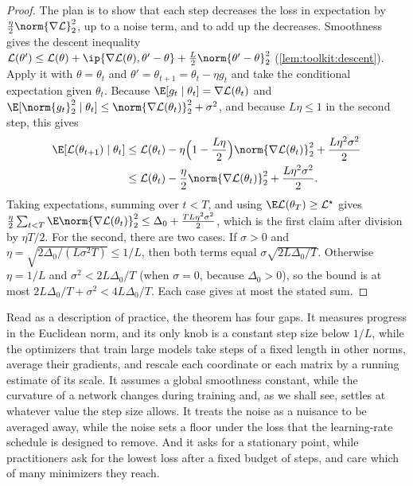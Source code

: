 \begin{refsection}
\begin{proof}
The plan is to show that each step decreases the loss in expectation by $\frac\eta2\norm{\nabla\Loss}_2^2$, up to a noise term, and to add up the decreases. Smoothness gives the descent inequality $\Loss(\theta')\le\Loss(\theta)+\ip{\nabla\Loss(\theta),\theta'-\theta}+\frac L2\norm{\theta'-\theta}_2^2$ (\cref{lem:toolkit:descent}). Apply it with $\theta=\theta_t$ and $\theta'=\theta_{t+1}=\theta_t-\eta g_t$ and take the conditional expectation given $\theta_t$. Because $\E[g_t\mid\theta_t]=\nabla\Loss(\theta_t)$ and $\E[\norm{g_t}_2^2\mid\theta_t]\le\norm{\nabla\Loss(\theta_t)}_2^2+\sigma^2$, and because $L\eta\le1$ in the second step, this gives
\[
\begin{aligned}
  \E[\Loss(\theta_{t+1})\mid\theta_t]&\le\Loss(\theta_t)-\eta\Bigl(1-\frac{L\eta}2\Bigr)\norm{\nabla\Loss(\theta_t)}_2^2+\frac{L\eta^2\sigma^2}2\\
  &\le\Loss(\theta_t)-\frac\eta2\norm{\nabla\Loss(\theta_t)}_2^2+\frac{L\eta^2\sigma^2}2.
\end{aligned}
\]
Taking expectations, summing over $t<T$, and using $\E\Loss(\theta_T)\ge\Loss^\star$ gives $\frac\eta2\sum_{t<T}\E\norm{\nabla\Loss(\theta_t)}_2^2\le\Delta_0+\frac{TL\eta^2\sigma^2}2$, which is the first claim after division by $\eta T/2$. For the second, there are two cases. If $\sigma>0$ and $\eta=\sqrt{2\Delta_0/(L\sigma^2T)}\le1/L$, then both terms equal $\sigma\sqrt{2L\Delta_0/T}$. Otherwise $\eta=1/L$ and $\sigma^2<2L\Delta_0/T$ (when $\sigma=0$, because $\Delta_0>0$), so the bound is at most $2L\Delta_0/T+\sigma^2<4L\Delta_0/T$. Each case gives at most the stated sum.
\end{proof}

Read as a description of practice, the theorem has four gaps. It measures progress in the Euclidean norm, and its only knob is a constant step size below $1/L$, while the optimizers that train large models take steps of a fixed length in other norms, average their gradients, and rescale each coordinate or each matrix by a running estimate of its scale. It assumes a global smoothness constant, while the curvature of a network changes during training and, as we shall see, settles at whatever value the step size allows. It treats the noise as a nuisance to be averaged away, while the noise sets a floor under the loss that the learning-rate schedule is designed to remove. And it asks for a stationary point, while practitioners ask for the lowest loss after a fixed budget of steps, and care which of many minimizers they reach.


\end{refsection}
